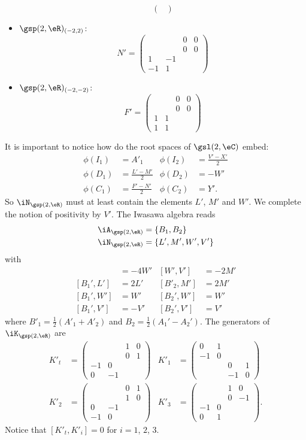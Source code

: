 \begin{itemize}
\[\begin{pmatrix}
\end{pmatrix}
\]
\item $\gsp(2,\eR)_{(-2,2)}$:
\[ 
  N'=\begin{pmatrix}
&&0&0\\&&0&0\\
1&-1\\
-1&1
\end{pmatrix}
\]
\item $\gsp(2,\eR)_{(-2,-2)}$:
\[ 
  F'=\begin{pmatrix}
&&0&0\\
&&0&0\\
1&1\\
1&1
\end{pmatrix}
\]
\end{itemize}
It is important to notice how do the root spaces of $\gsl(2,\eC)$ embed:
\begin{align}
\phi(I_1)&=A'_1	&\phi(I_2)&=\frac{ V'-X' }{ 2 }\\
\phi(D_1)&=\frac{ L'-M' }{2}	&\phi(D_2)&=-W'\\
\phi(C_1)&=\frac{ F'-N' }{2}	&\phi(C_2)&=Y'. 
\end{align}
So $\iN_{\gsp(2,\eR)}$ must at least contain the elements $L'$, $M'$ and $W'$. We complete the notion of positivity by $V'$. The Iwasawa algebra reads
\[ 
\begin{split}
\iA_{\gsp(2,\eR)}&=\{ B_1,B_2 \}\\
\iN_{\gsp(2,\eR)}&=\{ L',M',W',V' \}
\end{split}  
\]
with
\begin{align*}
[L',V']&=-4W'	&[W',V']&=-2M'\\
[B_1',L']&=2L'	&[B'_2,M']&=2M'\\
[B_1',W']&=W'	&[B_2',W']&=W'\\
[B_1',V']&=-V'	&[B_2',V']&=V'
\end{align*}
where $B'_1=\frac{ 1 }{2}(A'_1+A'_2)$ and $B_2=\frac{ 1 }{2}(A_1'-A_2')$. The generators of $\iK_{\gsp(2,\eR)}$ are
\begin{align*}
K'_t&=
\begin{pmatrix}
&&1&0\\
&&0&1\\
-1&0\\
0&-1
\end{pmatrix}
	&K'_1&=
\begin{pmatrix}
0&1\\-1&0\\
&&0&1\\
&&-1&0
\end{pmatrix}\\
K'_2&=
\begin{pmatrix}
&&0&1\\&&1&0\\0&-1\\-1&0
\end{pmatrix}
	&K'_3&=
\begin{pmatrix}
&&1&0\\
&&0&-1\\
-1&0\\
0&1
\end{pmatrix}.
\end{align*}
Notice that $[K'_t,K'_i]=0$ for $i=1$, $2$, $3$.


